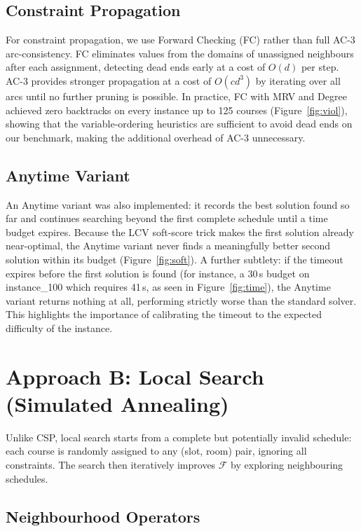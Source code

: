 \documentclass[letterpaper]{article}
\begin{document}
\subsection{Constraint Propagation}

For constraint propagation, we use Forward Checking (FC) rather than full AC-3 arc-consistency. FC eliminates values from the domains of unassigned neighbours after each assignment, detecting dead ends early at a cost of $O(d)$ per step. AC-3 provides stronger propagation at a cost of $O(cd^3)$ by iterating over all arcs until no further pruning is possible. In practice, FC with MRV and Degree achieved zero backtracks on every instance up to 125 courses (Figure~\ref{fig:viol}), showing that the variable-ordering heuristics are sufficient to avoid dead ends on our benchmark, making the additional overhead of AC-3 unnecessary.

\subsection{Anytime Variant}

An Anytime variant was also implemented: it records the best solution found so far and continues searching beyond the first complete schedule until a time budget expires. Because the LCV soft-score trick makes the first solution already near-optimal, the Anytime variant never finds a meaningfully better second solution within its budget (Figure~\ref{fig:soft}). A further subtlety: if the timeout expires before the first solution is found (for instance, a 30\,s budget on instance\_100 which requires 41\,s, as seen in Figure~\ref{fig:time}), the Anytime variant returns nothing at all, performing strictly worse than the standard solver. This highlights the importance of calibrating the timeout to the expected difficulty of the instance.

\section{Approach B: Local Search (Simulated Annealing)}

Unlike CSP, local search starts from a complete but potentially invalid schedule: each course is randomly assigned to any (slot, room) pair, ignoring all constraints. The search then iteratively improves $\mathcal{F}$ by exploring neighbouring schedules.

\subsection{Neighbourhood Operators}
\end{document}
